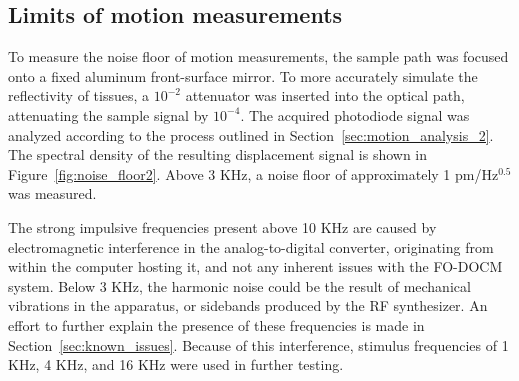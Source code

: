 \subsection{Limits of motion measurements}

To measure the noise floor of motion measurements, the sample path was focused onto a fixed aluminum front-surface mirror. 
To more accurately simulate the reflectivity of tissues, a $10^{-2}$ attenuator was inserted into the optical path, attenuating the sample signal by $10^{-4}$. The acquired photodiode signal was analyzed according to the process outlined in Section~\ref{sec:motion_analysis_2}. The spectral density of the resulting displacement signal is shown in Figure~\ref{fig:noise_floor2}.
Above 3 KHz, a noise floor of approximately 1 pm/Hz$^{0.5}$ was measured.

The strong impulsive frequencies present above 10 KHz are caused by electromagnetic interference in the analog-to-digital converter, originating from within the computer hosting it, and not any inherent issues with the FO-DOCM system. Below 3 KHz, the harmonic noise could be the result of mechanical vibrations in the apparatus, or sidebands produced by the RF synthesizer. An effort to further explain the presence of these frequencies is made in Section~\ref{sec:known_issues}. Because of this interference, stimulus frequencies of 1 KHz, 4 KHz, and 16 KHz were used in further testing. %


